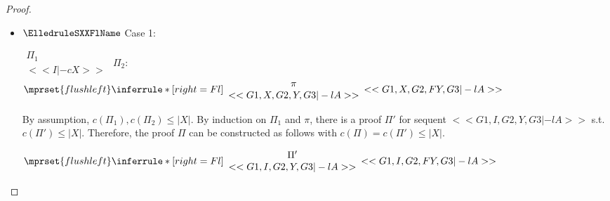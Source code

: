 \begin{proof}
\begin{enumerate}
\begin{itemize}
  \item $\ElledruleSXXFlName$ Case 1:
    \begin{center}
      \scriptsize
      \begin{math}
        \begin{array}{c}
          \Pi_1 \\
          {<<I |-c X>>}
        \end{array}
      \end{math}
      \qquad\qquad
      $\Pi_2$:
      \begin{math}
        $$\mprset{flushleft}
        \inferrule* [right={\tiny Fl}] {
          {
            \begin{array}{c}
              \pi \\
              {<<G1, X, G2, Y, G3 |-l A>>}
            \end{array}
          }
        }{<<G1, X, G2, F Y, G3 |-l A>>}
      \end{math}
    \end{center}
    By assumption, $c(\Pi_1),c(\Pi_2)\leq |X|$. By induction on $\Pi_1$ and $\pi$, there is a
    proof $\Pi'$ for sequent $<<G1, I, G2, Y, G3 |-l A>>$ s.t. $c(\Pi') \leq |X|$. Therefore,
    the proof $\Pi$ can be constructed as follows with $c(\Pi) = c(\Pi') \leq |X|$.
    \begin{center}
      \scriptsize
      \begin{math}
        $$\mprset{flushleft}
        \inferrule* [right={\tiny Fl}] {
          {
            \begin{array}{c}
              \Pi' \\
              {<<G1, I, G2, Y, G3 |-l A>>}
            \end{array}
          }
        }{<<G1, I, G2, F Y, G3 |-l A>>}
      \end{math}
    \end{center}


\end{itemize}
\end{enumerate}
\end{proof}
